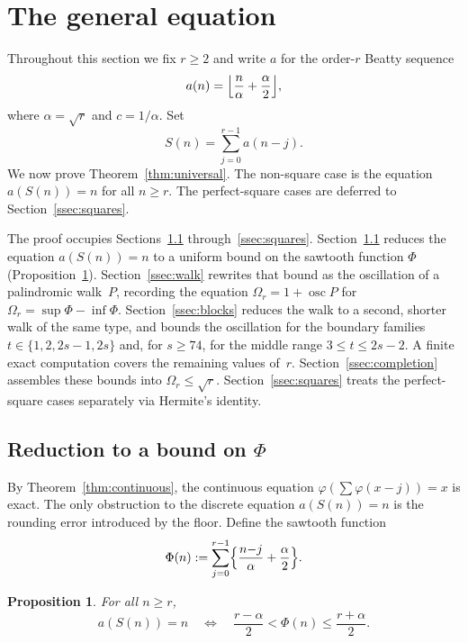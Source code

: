 \documentclass{birkjour}
\newtheorem{proposition}[theorem]{Proposition}
\theoremstyle{definition}
\theoremstyle{remark}
\begin{document}
\section{The general equation}\label{sec:universal}

Throughout this section we fix $r\ge 2$ and write
$a$ for the order-$r$ Beatty sequence
\begin{equation*}  a(n)=\Bigl\lfloor
  \frac{n}{\alpha}+\frac{\alpha}{2}
  \Bigr\rfloor,
\end{equation*}
where $\alpha=\sqrt{r}$ and $c=1/\alpha$.
Set
\[
  S(n)=\sum_{j=0}^{r-1}a(n{-}j).
\]
We now prove Theorem~\ref{thm:universal}. The non-square case
is the equation $a(S(n))=n$ for all $n\ge r$. The
perfect-square cases are deferred to
Section~\ref{ssec:squares}.

The proof occupies Sections~\ref{ssec:discretization}
through~\ref{ssec:squares}.
Section~\ref{ssec:discretization} reduces the
equation $a(S(n))=n$ to a uniform bound on the
sawtooth function $\Phi$
(Proposition~\ref{prop:reduction}).
Section~\ref{ssec:walk} rewrites that bound as the
oscillation of a palindromic walk~$P$, recording the equation
$\Omega_{r}=1+\operatorname{osc}P$ for
$\Omega_{r}=\sup\Phi-\inf\Phi$.
Section~\ref{ssec:blocks} reduces the walk to a second,
shorter walk of the same type, and bounds the oscillation for
the boundary families $t\in\{1,2,2s{-}1,2s\}$ and, for
$s\ge 74$, for the middle range $3\le t\le 2s-2$. A finite
exact computation covers the remaining values of~$r$.
Section~\ref{ssec:completion} assembles these bounds into
$\Omega_{r}\le\sqrt{r}$.
Section~\ref{ssec:squares} treats the perfect-square
cases separately via Hermite's identity.

\subsection{Reduction to a bound on \texorpdfstring{$\Phi$}{Phi}}
\label{ssec:discretization}

By Theorem~\ref{thm:continuous}, the continuous
equation $\varphi(\sum\varphi(x{-}j))=x$ is exact.
The only obstruction to the discrete equation
$a(S(n))=n$ is the rounding error introduced
by the floor.
Define the sawtooth function
\[
  \Phi(n)
  :=\sum_{j=0}^{r-1}
  \Bigl\{\frac{n{-}j}{\alpha}+\frac{\alpha}{2}
  \Bigr\}.
\]

\begin{proposition}\label{prop:reduction}
For all $n\ge r$,
\[
  a(S(n))=n
  \quad\iff\quad
  \frac{r-\alpha}{2}
  <\Phi(n)
  \le\frac{r+\alpha}{2}.
\]
\end{proposition}
\end{document}
